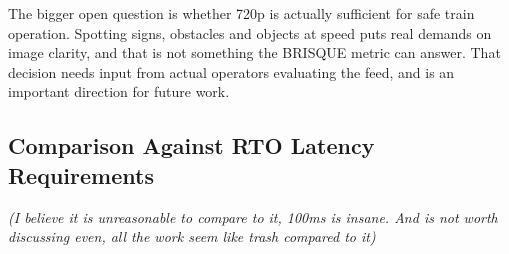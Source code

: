 The bigger open question is whether 720p is actually sufficient for safe train operation. Spotting signs, obstacles and objects at speed puts real demands on image clarity, and that is not something the BRISQUE metric can answer. That decision needs input from actual operators evaluating the feed, and is an important direction for future work.


\subsection{Comparison Against RTO Latency Requirements}\label{subsec:disc_threshold}
\textit{(I believe it is unreasonable to compare to it, 100ms is insane. And is not worth discussing even, all the work seem like trash compared to it)}

